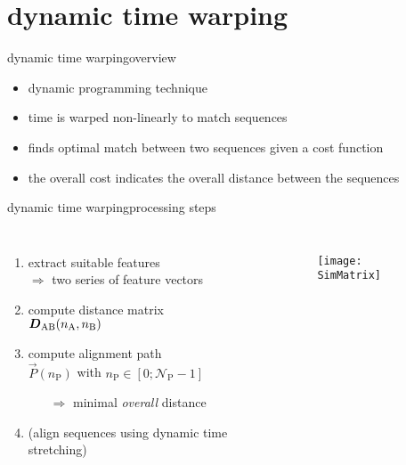     \section[DTW]{dynamic time warping}
        \begin{frame}{dynamic time warping}{overview}
            \begin{itemize}
                \item   dynamic programming technique
                \smallskip
                \item   time is warped non-linearly to match sequences
                \smallskip
                \item   finds optimal match between two sequences given a cost function
                \smallskip
                \item   the overall cost indicates the overall distance between the sequences
            \end{itemize}
        \end{frame}
        \begin{frame}{dynamic time warping}{processing steps}
            \begin{columns}
                \begin{enumerate}
                    \item   extract suitable features\\ $\Rightarrow$ two series of feature vectors
                    \smallskip
                    \item<1->	compute distance matrix\\ $\mat{D}_{\mathrm{AB}}(n_\mathrm{A},n_\mathrm{B})$
                    \smallskip
                    \item<1->	compute alignment path\\ $\vec{P}(n_\mathrm{P})$ with $n_\mathrm{P} \in
                [0;\mathcal{N}_{\mathrm{P}}-1]$
                        \begin{itemize}
                            \item[$\Rightarrow$]	minimal \textit{overall} distance
                        \end{itemize}
                    \smallskip
                    \item<1->   (align sequences using dynamic time stretching)
                \end{enumerate}
                \begin{figure}
                    \texttt{[image: SimMatrix]}
                \end{figure}
            \end{columns}
        \end{frame}
